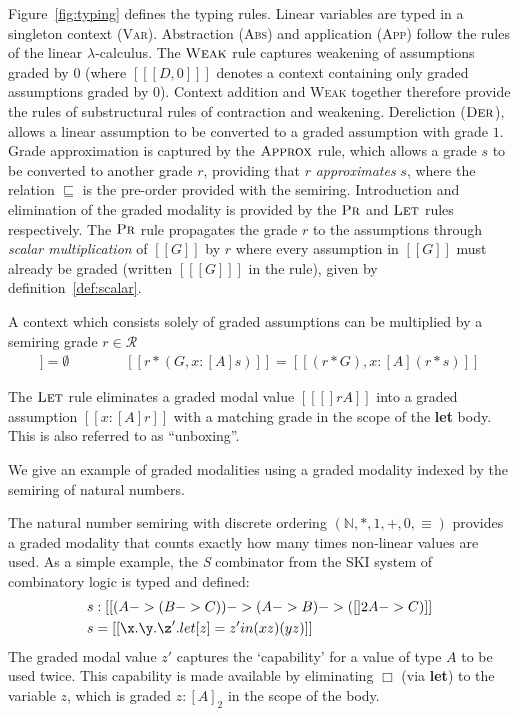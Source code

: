 Figure~\ref{fig:typing} defines the typing rules.
Linear variables are typed in a singleton context
(\textsc{Var}). Abstraction (\textsc{Abs}) and application (\textsc{App})
follow the rules of the linear $\lambda$-calculus.
The $\textsc{Weak}$ rule captures
weakening of assumptions graded by $0$ (where $[[ [ D , 0 ] ]]$ denotes a context
containing only graded assumptions graded by $0$). Context addition and
\textsc{Weak} together therefore provide the rules of substructural rules of contraction
and weakening.
Dereliction ($\textsc{Der}$),
allows a linear assumption to be converted to a graded assumption with grade
$1$. Grade approximation is captured by the $\textsc{Approx}$
rule, which allows a grade $s$ to be converted to another grade $r$,
providing that $r$ \textit{approximates} $s$, where the relation
$\sqsubseteq$ is the pre-order provided
with the semiring.
Introduction and elimination of the graded modality is provided by the
$\textsc{Pr}$ and $\textsc{Let}$ rules
respectively. The $\textsc{Pr}$ rule propagates the grade $r$ to the
assumptions through \emph{scalar multiplication} of $[[G]]$ by $r$ where
every assumption in $[[ G ]]$ must already be graded (written $[[ [ G
] ]]$ in the rule), given by definition~\eqref{def:scalar}.
%
%
\begin{definition}
  \label{def:scalar}
 A context which consists solely of graded assumptions can be multiplied by a
 semiring grade $r \in \mathcal{R}$
\begin{align*}
   [[ r * . ]] = \emptyset
    \qquad\qquad
    [[ r * (G , x : [ A ] s) ]] = [[ (r * G), x : [ A ] (r * s) ]]
\end{align*}
\end{definition}

The $\textsc{Let}$ rule eliminates a graded modal value $[[ [] r A ]]$
into a graded assumption $[[ x : [ A ] r ]]$ with a matching
grade in the scope of the \textbf{let} body. This is also referred to as
``unboxing''.


We give an example of graded modalities using a graded modality indexed
by the semiring of natural numbers.

\begin{example}
\label{ex:s-comb}
  The natural number semiring with discrete ordering
  $(\mathbb{N}, \ast, 1, +, 0, \equiv)$ provides a graded modality
  that counts exactly how many times non-linear values are used. As a
  simple example, the \emph{S} combinator from the SKI system of combinatory logic is typed and defined:
\begin{align*}
s & : [[ (A -> (B -> C)) -> {(A -> B) -> ({[] 2 A} -> C)} ]] \\
s & = [[ \x . {\y . {\z' . {let [ z ] = z' in {(x z) (y z)}}}} ]]
\end{align*}
The graded modal value $z'$ captures the `capability' for a value
of type $A$ to be used twice. This capability is made available by eliminating
$\Box$ (via \textbf{let}) to the variable $z$, which is
graded $z : [A]_2$ in the scope of the body.
\end{example}



